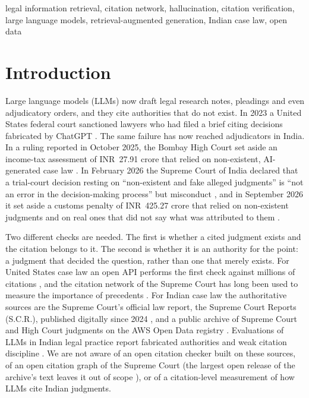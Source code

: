 \documentclass[conference]{IEEEtran}
\begin{document}
\begin{IEEEkeywords}
legal information retrieval, citation network, hallucination, citation verification, large language models, retrieval-augmented generation, Indian case law, open data
\end{IEEEkeywords}

\section{Introduction}
Large language models (LLMs) now draft legal research notes, pleadings and even adjudicatory orders, and they cite authorities that do not exist. In 2023 a United States federal court sanctioned lawyers who had filed a brief citing decisions fabricated by ChatGPT \cite{mata}. The same failure has now reached adjudicators in India. In a ruling reported in October 2025, the Bombay High Court set aside an income-tax assessment of INR~27.91 crore that relied on non-existent, AI-generated case law \cite{kmgwires}. In February 2026 the Supreme Court of India declared that a trial-court decision resting on ``non-existent and fake alleged judgments'' is ``not an error in the decision-making process'' but misconduct \cite{gummadi}, and in September 2026 it set aside a customs penalty of INR~425.27 crore that relied on non-existent judgments and on real ones that did not say what was attributed to them \cite{gadiya}.

Two different checks are needed. The first is whether a cited judgment exists and the citation belongs to it. The second is whether it is an authority for the point: a judgment that decided the question, rather than one that merely exists. For United States case law an open API performs the first check against millions of citations \cite{courtlistenerapi}, and the citation network of the Supreme Court has long been used to measure the importance of precedents \cite{fowler2007}. For Indian case law the authoritative sources are the Supreme Court's official law report, the Supreme Court Reports (S.C.R.), published digitally since 2024 \cite{digiscr}, and a public archive of Supreme Court and High Court judgments on the AWS Open Data registry \cite{awssc,awshc}. Evaluations of LLMs in Indian legal practice report fabricated authorities and weak citation discipline \cite{hemrajani2025,juvekar2025}. We are not aware of an open citation checker built on these sources, of an open citation graph of the Supreme Court (the largest open release of the archive's text leaves it out of scope \cite{openindialaw}), or of a citation-level measurement of how LLMs cite Indian judgments.
\end{document}

